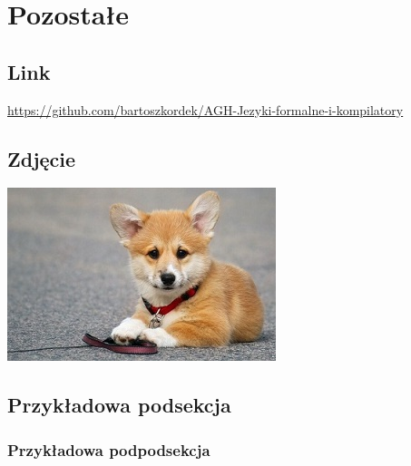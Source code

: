 \documentclass{report}
\begin{document}
    
    \section{Pozostałe}
        \subsection{Link}
            \url{https://github.com/bartoszkordek/AGH-Jezyki-formalne-i-kompilatory}

        \subsection{Zdjęcie}
            \includegraphics{../corgi.jpg}

        \subsection{Przykładowa podsekcja}
            \subsubsection{Przykładowa podpodsekcja}
\end{document}

